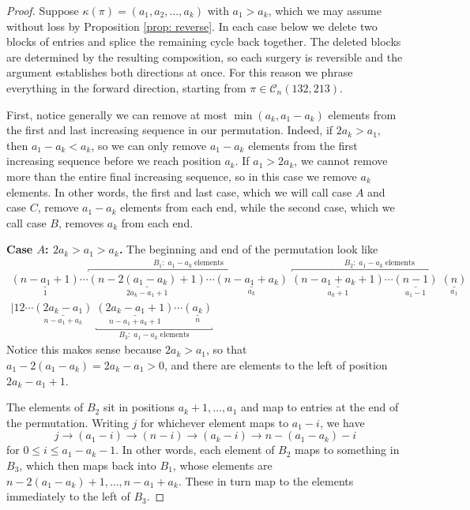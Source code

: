 \documentclass[10pt,a4paper]{amsart}
\newcommand\C{\mathcal C}
\begin{document}
\begin{proof}
    Suppose $\kappa(\pi) = (a_1,a_2,\dots,a_k)$ with $a_1 > a_k$, which we may assume without loss by Proposition \ref{prop: reverse}. In each case below we delete two blocks of entries and splice the remaining cycle back together. The deleted blocks are determined by the resulting composition, so each surgery is reversible and the argument establishes both directions at once. For this reason we phrase everything in the forward direction, starting from $\pi \in \C_n(132,213)$.

    First, notice generally we can remove at most $\min(a_k,a_1-a_k)$ elements from the first and last increasing sequence in our permutation. Indeed, if $2a_k > a_1$, then $a_1 - a_k < a_k$, so we can only remove $a_1-a_k$ elements from the first increasing sequence before we reach position $a_k$. If $a_1 > 2a_k$, we cannot remove more than the entire final increasing sequence, so in this case we remove $a_k$ elements. In other words, the first and last case, which we will call case $A$ and case $C$, remove $a_1 - a_k$ elements from each end, while the second case, which we call case $B$, removes $a_k$ from each end.

    \medskip
    \noindent\textbf{Case $A$: $2a_k > a_1 > a_k$.} The beginning and end of the permutation look like
    \[
    \begin{gathered}
    \underset{1}{\underline{(n-a_1+1)}} \cdots \overbracket{\underset{2a_k - a_1 + 1}{\underline{(n-2(a_1-a_k) + 1)}}\cdots\underset{a_k}{\underline{(n-a_1+a_k)}}}^{B_1: \; a_1-a_k \; \text{elements}}\; \overbracket{\underset{a_k+1}{\underline{(n-a_1+a_k+1)}}\cdots \underset{a_1-1}{\underline{(n-1)}} \;\underset{a_1}{\underline{(n)}}}^{B_2: \; a_1-a_k \; \text{elements}} \\  |12 \cdots \underset{n-a_1+a_k}{\underline{(2a_k-a_1)}} \; \underbracket{\underset{n-a_1+a_k+1}{\underline{(2a_k-a_1+1)}}\cdots \underset{n}{\underline{(a_k)}}}_{B_3: \; a_1-a_k \; \text{elements}}
    \end{gathered}
    \]
    Notice this makes sense because $2a_k > a_1$, so that $a_1 - 2(a_1-a_k) = 2a_k - a_1 > 0$, and there are elements to the left of position $2a_k - a_1 + 1$.

    The elements of $B_2$ sit in positions $a_k+1,\dots,a_1$ and map to entries at the end of the permutation. Writing $j$ for whichever element maps to $a_1 - i$, we have
    \[
    j \to (a_1 - i) \to (n-i) \to (a_k-i) \to n- (a_1-a_k) -i
    \]
    for $0 \leq i \leq a_1 - a_k - 1$. In other words, each element of $B_2$ maps to something in $B_3$, which then maps back into $B_1$, whose elements are $n-2(a_1-a_k) + 1,\dots,n-a_1+a_k$. These in turn map to the elements immediately to the left of $B_3$.


\end{proof}
\end{document}
